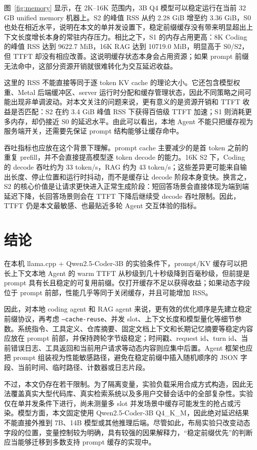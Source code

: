 \documentclass[10pt]{article}
\begin{document}
图~\ref{fig:memory} 显示，在 2K--16K 范围内，3B Q4 模型可以稳定运行在当前 32 GB unified memory 机器上。S2 的峰值 RSS 从约 2.28 GiB 增至约 3.36 GiB，S0 也处在相近水平，说明在本文的单并发设置下，稳定前缀缓存没有带来明显超出上下文长度增长本身的常驻内存压力。相比之下，S1 的内存占用更高：8K Coding 的峰值 RSS 达到 9622.7 MiB，16K RAG 达到 10719.0 MiB，明显高于 S0/S2，但 TTFT 却没有相应改善。这说明缓存状态本身会占用资源；如果 prompt 前缀无法命中，这部分资源开销就很难转化为交互延迟收益。

这里的 RSS 不能直接等同于逐 token KV cache 的理论大小。它还包含模型权重、Metal 后端缓冲区、server 运行时分配和缓存管理状态，因此不同策略之间可能出现非单调波动。对本文关注的问题来说，更有意义的是资源开销和 TTFT 收益是否匹配：S2 在约 3.4 GiB 峰值 RSS 下获得百倍级 TTFT 加速；S1 则消耗更多内存，却仍接近 S0 的延迟水平。由此可以看出，本地 Agent 不能只把缓存视为服务端开关，还需要先保证 prompt 结构能够让缓存命中。

吞吐指标也应放在这个背景下理解。prompt cache 主要减少的是首 token 之前的重复 prefill，并不会直接提高模型逐 token decode 的能力。16K S2 下，Coding 的 decode 吞吐约为 33 token/s，RAG 约为 43 token/s；这些差异更可能来自输出长度、停止位置和运行时抖动，而不是缓存让 decode 阶段本身变快。换言之，S2 的核心价值是让请求更快进入正常生成阶段：短回答场景会直接体现为端到端延迟下降，长回答场景则会在 TTFT 下降后继续受 decode 吞吐限制。因此，TTFT 仍是本文最敏感、也最贴近多轮 Agent 交互体验的指标。

\section{结论}
\label{sec:conclusion}

在本机 llama.cpp + Qwen2.5-Coder-3B 的实验条件下，prompt/KV 缓存可以把长上下文本地 Agent 的 warm TTFT 从秒级到几十秒级降到百毫秒级，但前提是 prompt 具有长且稳定的可复用前缀。仅打开缓存不足以获得收益；如果动态字段位于 prompt 前部，性能几乎等同于关闭缓存，并且可能增加 RSS。

因此，对本地 coding agent 和 RAG agent 来说，更有效的优化顺序是先建立稳定前缀协议，再考虑 \texttt{--cache-reuse}、并发 slot、上下文长度和模型量化等细节参数。系统指令、工具定义、仓库摘要、固定文档上下文和长期记忆摘要等稳定内容应放在 prompt 前部，并保持跨轮字节级稳定；时间戳、request id、turn id、当前错误日志、工具返回和当前用户请求等动态内容则应集中后置。Agent 框架也应把 prompt 组装视为性能敏感路径，避免在稳定前缀中插入随机顺序的 JSON 字段、当前时间、临时路径、计数器或日志片段。

不过，本文仍存在若干限制。为了隔离变量，实验负载采用合成方式构造，因此无法覆盖真实大型代码库、真实检索系统以及多用户交替会话中的全部复杂性。实验仅在单并发条件下进行，尚未测量多 slot 并发场景中缓存可能发生的抢占或污染。模型方面，本文固定使用 Qwen2.5-Coder-3B Q4\_K\_M，因此绝对延迟结果不能直接外推到 7B、14B 模型或其他推理后端。尽管如此，布局实验只改变动态字段的位置，变量控制较为明确，具有较强的因果解释力，“稳定前缀优先”的判断应当能够迁移到多数支持 prompt 缓存的实现中。



\end{document}
